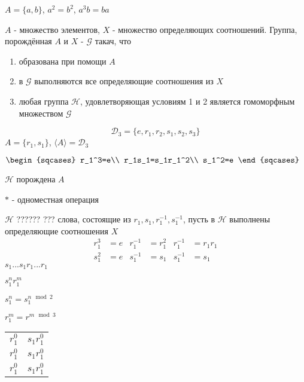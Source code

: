 \documentclass[../main/document.tex]{subfiles}
\begin{document}
\begin{exm}
$A=\{a,b\}$, $a^2=b^2$, $a^3b=ba$
\end{exm}

\begin{dfn}
$A$ - множество элементов, $X$ - множество определяющих соотношений. Группа, порождённая $A$ и $X$ - $\mathcal{G}$ такач, что
\begin{enumerate}
\item образована при помощи $A$
\item в $\mathcal{G}$ выполняются все определяющие соотношения из $X$
\item любая группа $\mathcal{H}$, удовлетворяющая условиям 1 и 2 является гомоморфным множеством $\mathcal{G}$
\end{enumerate}
\end{dfn}

\begin{exm}
$$\mathcal{D}_3=\{e,r_1,r_2,s_1,s_2,s_3\}$$
$A=\{r_1,s_1\}$, $\langle A\rangle=\mathcal{D}_3$

$
\begin{sqcases}
r_1^3=e\\
r_1s_1=s_1r_1^2\\
s_1^2=e
\end{sqcases}$

$\mathcal{H}$ порождена $A$

$*$ - одноместная операция

$\mathcal{H}$ ?????? ??? слова, состоящие из $r_1,s_1,r_1^{-1},s_1^{-1}$, пусть в $\mathcal{H}$ выполнены определяющие соотношения $X$
\begin{align*}
r_1^3&=e & r_1^{-1}&=r_1^2 & r_1^{-1}&=r_1r_1\\
s_1^2&=e & s_1^{-1}&=s_1 & s_1^{-1}&=s_1
\end{align*}
$s_1...s_1r_1...r_1$

$s_1^nr_1^m$

$s_1^n=s_1^{n\mod 2}$

$r_1^m=r^{m\mod 3}$
\begin{table}[h]
\renewcommand*{\arraystretch}{1.4}
\begin{tabular}{|c c|}

\hline
 $r_1^0$ & $s_1r_1^0$  \\ 
$r_1^0$ & $s_1r_1^0$ \\ 
$r_1^0$ & $s_1r_1^0$  \\ 
\hline
\end{tabular}
\end{table}
\end{exm}
\end{document}

